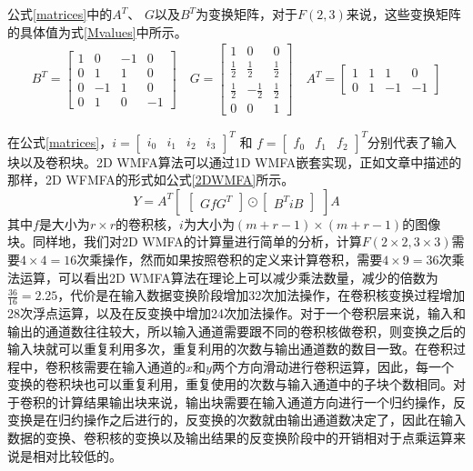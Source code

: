 公式\ref{matrices}中的$A^T$、 $G$以及$B^T$为变换矩阵，对于$F(2,3)$来说，这些变换矩阵的具体值为式\ref{Mvalues}中所示。
\begin{equation} 
\label{Mvalues}
\begin{split}
B^T = \begin{bmatrix}
1 & 0 & -1 & 0 \\
0 & 1 & 1 & 0 \\
0 & -1 & 1 & 0 \\
0 & 1 & 0 & -1 
\end{bmatrix} \quad G = \begin{bmatrix}
1 & 0 & 0 \\
\frac{1}{2} & \frac{1}{2} & \frac{1}{2} \\
\frac{1}{2} & -\frac{1}{2} & \frac{1}{2} \\
0 & 0 & 1
\end{bmatrix} \quad A^T = \begin{bmatrix}
1 & 1 & 1 & 0 \\
0 & 1 &-1 & -1
\end{bmatrix} 
\end{split}
\end{equation}

在公式\ref{matrices}，$i = {\begin{bmatrix}
i_0 & i_1 & i_2 & i_3
\end{bmatrix}}^T$  和 $f = {\begin{bmatrix}
f_0 & f_1 & f_2  
\end{bmatrix}}^T$分别代表了输入块以及卷积块。2D WMFA算法可以通过1D WMFA嵌套实现，正如文章中描述的那样，2D WFMFA的形式如公式\ref{2DWMFA}所示。
\begin{equation}
\label{2DWMFA}
Y = A^T\begin{bmatrix}
\begin{bmatrix}
GfG^T
\end{bmatrix} \odot \begin{bmatrix}
B^TiB
\end{bmatrix}
\end{bmatrix}A
\end{equation}  
其中$f$是大小为$r \times r$的卷积核，$i$为大小为$(m+r-1) \times (m+r-1)$的图像块。同样地，我们对2D WMFA的计算量进行简单的分析，计算$F(2\times 2,3\times 3)$需要$4 \times 4 = 16$次乘操作，然而如果按照卷积的定义来计算卷积，需要$4 \times 9 =36$次乘法运算，可以看出2D WMFA算法在理论上可以减少乘法数量，减少的倍数为$\frac{36}{16}=2.25$，代价是在输入数据变换阶段增加32次加法操作，在卷积核变换过程增加28次浮点运算，以及在反变换中增加24次加法操作。对于一个卷积层来说，输入和输出的通道数往往较大，所以输入通道需要跟不同的卷积核做卷积，则变换之后的输入块就可以重复利用多次，重复利用的次数与输出通道数的数目一致。在卷积过程中，卷积核需要在输入通道的$x$和$y$两个方向滑动进行卷积运算，因此，每一个变换的卷积块也可以重复利用，重复使用的次数与输入通道中的子块个数相同。对于卷积的计算结果输出块来说，输出块需要在输入通道方向进行一个归约操作，反变换是在归约操作之后进行的，反变换的次数就由输出通道数决定了，因此在输入数据的变换、卷积核的变换以及输出结果的反变换阶段中的开销相对于点乘运算来说是相对比较低的。

